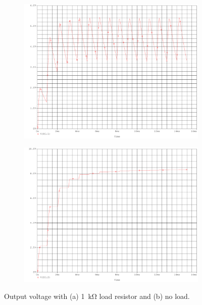 \documentclass{report}
\begin{document}
\begin{figure}[h]
	\begin{subfigure}{0.5\textwidth}
		\centering
		\includegraphics[width=\linewidth]{exp5load}
		\caption{}
		\label{fig:exp5load}
	\end{subfigure}
	\begin{subfigure}{0.5\textwidth}
		\centering
		\includegraphics[width=\linewidth]{exp5noload}
		\caption{}
		\label{fig:exp5noload}
	\end{subfigure}
	\caption{Output voltage with (a) \SI{1}{\kohm} load resistor and (b) no load.}
	\label{fig:exp5sim}
\end{figure}
\pagebreak
\end{document}
